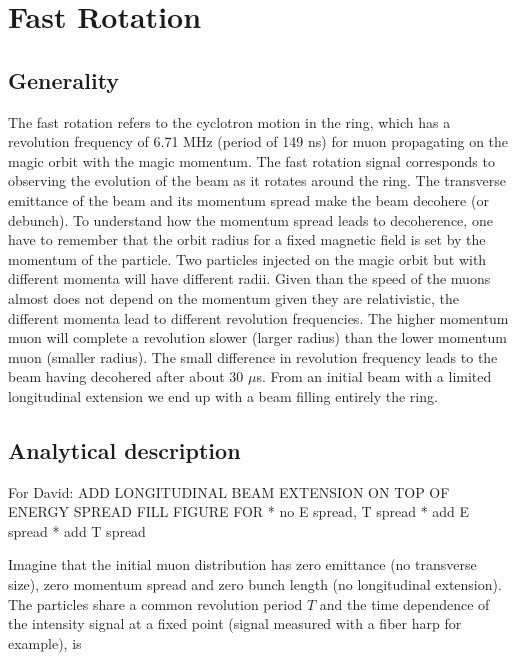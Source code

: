 \section{Fast Rotation}


\subsection{Generality}

The fast rotation refers to the cyclotron motion in the ring, which has a revolution frequency of 6.71 MHz (period of 149 ns) 
for muon propagating on the magic orbit with the magic momentum. 
The fast rotation signal corresponds to observing the evolution of the beam as it rotates around the ring. 
The transverse emittance of the beam and its momentum spread make the beam decohere (or debunch).
To understand how the momentum spread leads to decoherence, one have to remember that the orbit radius for a fixed magnetic
field is set by the momentum of the particle. Two particles injected on the magic orbit but with different momenta will
have different radii. Given than the speed of the muons almost does not depend on the momentum given they are relativistic,
the different momenta lead to different revolution frequencies. The higher momentum muon will complete a revolution
slower (larger radius) than the lower momentum muon (smaller radius). 
The small difference in revolution frequency leads to the beam having decohered after about 30 $\mu$s. 
From an initial beam with a limited longitudinal extension we end up with a beam filling entirely the ring.

\subsection{Analytical description}

For David:\newline
ADD LONGITUDINAL BEAM EXTENSION ON TOP OF ENERGY SPREAD \newline
FILL FIGURE FOR\newline
  * no  E spread, T spread\newline
  * add E spread\newline
  * add T spread\newline

Imagine that the initial muon distribution has zero emittance (no transverse size), zero momentum spread and zero bunch length (no longitudinal extension). 
The particles share a common revolution period $T$ and the time dependence of the intensity signal at a fixed point (signal measured with a fiber harp for example), is 

